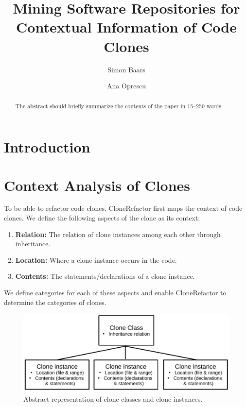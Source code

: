 \documentclass[runningheads]{llncs}
\begin{document}
%
\title{Mining Software Repositories for Contextual Information of Code Clones}
%
%
\author{Simon Baars \and
Ana Oprescu}
%
%
%
\maketitle              %
%
\begin{abstract}
The abstract should briefly summarize the contents of the paper in
15--250 words.

\end{abstract}
%
%
%
\section{Introduction}


\section{Context Analysis of Clones}\label{chap:contextsetup}
To be able to refactor code clones, CloneRefactor first maps the context of code clones. We define the following aspects of the clone as its context:
\begin{enumerate}
  \item \textbf{Relation:} The relation of clone instances among each other through inheritance.
  \item \textbf{Location:} Where a clone instance occurs in the code.
  \item \textbf{Contents:} The statements/declarations of a clone instance.
\end{enumerate}
We define categories for each of these aspects and enable CloneRefactor to determine the categories of clones.

\begin{figure}[H]
  \centering
    \includegraphics[width=1\columnwidth]{img/context}
    \caption{Abstract representation of clone classes and clone instances.}
  \label{fig:clonecontext}
\end{figure}
\end{document}
